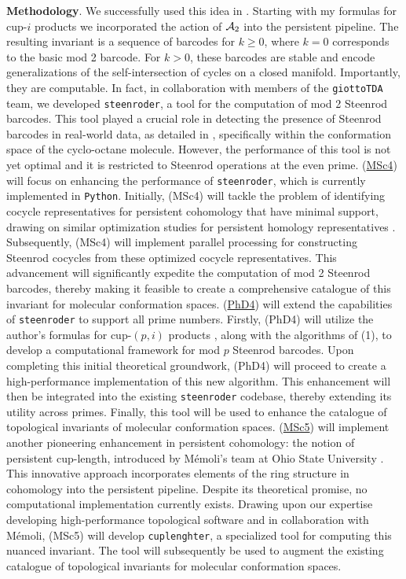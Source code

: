 \medskip\noindent\textbf{Methodology}.
We successfully used this idea in \cite{medina2022per_st}.
Starting with my formulas for cup-$i$ products \cite{medina2023fast_sq} we incorporated the action of $\mathcal{A}_2$ into the persistent pipeline.
The resulting invariant is a sequence of barcodes for $k \geq 0$, where $k = 0$ corresponds to the basic mod 2 barcode.
For $k > 0$, these barcodes are stable and encode generalizations of the self-intersection of cycles on a closed manifold. Importantly, they are computable.
In fact, in collaboration with members of the \texttt{giottoTDA} team, we developed \texttt{steenroder}, a tool for the computation of mod 2 Steenrod barcodes.
This tool played a crucial role in detecting the presence of Steenrod barcodes in real-world data, as detailed in \cite{medina2022per_st}, specifically within the conformation space of the cyclo-octane molecule.
However, the performance of this tool is not yet optimal and it is restricted to Steenrod operations at the even prime.
(\underline{MSc4})
will focus on enhancing the performance of \texttt{steenroder}, which is currently implemented in \texttt{Python}.
Initially, (MSc4) will tackle the problem of identifying cocycle representatives for persistent cohomology that have minimal support, drawing on similar optimization studies for persistent homology representatives \cite{minimal, obayashi2018optimal}.
Subsequently, (MSc4) will implement parallel processing for constructing Steenrod cocycles from these optimized cocycle representatives.
This advancement will significantly expedite the computation of mod 2 Steenrod barcodes, thereby making it feasible to create a comprehensive catalogue of this invariant for molecular conformation spaces.
(\underline{PhD4}) will extend the capabilities of \texttt{steenroder} to support all prime numbers.
Firstly, (PhD4) will utilize the author's formulas for cup-$(p,i)$ products \cite{medina2021may_st}, along with the algorithms of (1), to develop a computational framework for mod $p$ Steenrod barcodes.
Upon completing this initial theoretical groundwork, (PhD4) will proceed to create a high-performance implementation of this new algorithm.
This enhancement will then be integrated into the existing \texttt{steenroder} codebase, thereby extending its utility across primes.
Finally, this tool will be used to enhance the catalogue of topological invariants of molecular conformation spaces.
(\underline{MSc5})
will implement another pioneering enhancement in persistent cohomology: the notion of persistent cup-length, introduced by M\'emoli's team at Ohio State University \cite{memoli2022cup_length}.
This innovative approach incorporates elements of the ring structure in cohomology into the persistent pipeline.
Despite its theoretical promise, no computational implementation currently exists.
Drawing upon our expertise developing high-performance topological software and in collaboration with M\'emoli, (MSc5) will develop \texttt{cuplenghter}, a specialized tool for computing this nuanced invariant.
The tool will subsequently be used to augment the existing catalogue of topological invariants for molecular conformation spaces.

